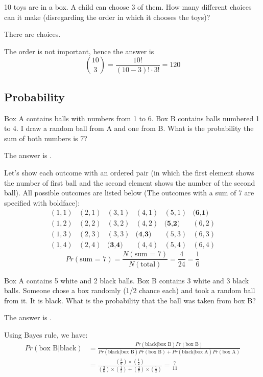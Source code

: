 \documentclass{ximera}
\begin{document}
\begin{question}
10 toys are in a box.  A child can choose 3 of them.  How many different choices can it make (disregarding the order in which it chooses the toys)?  
\begin{solution}
There are  choices.
\end{solution}
The order is not important, hence the answer is
\[
\binom{10}{3} = \frac{10!}{(10-3)! \cdot 3!} = 120
\]
\end{question}

\subsection*{Probability}

\begin{question}
Box A contains balls with numbers from 1 to 6.  Box B contains balls numbered 1 to 4.   I draw a random ball from A and one from B.  What is the probability the sum of both numbers is 7?
\begin{solution}
The answer is .
\end{solution}
Let's show each outcome with an ordered pair (in which the first element shows the number of first ball and the second element shows the number of the second ball). All possible outcomes are listed below (The outcomes with a sum of 7 are specified with boldface):
\[
\begin{matrix}
(1,1) & (2,1) & (3,1) & (4,1) & (5,1) & \textbf{(6,1)} \\
(1,2) & (2,2) & (3,2) & (4,2) & \textbf{(5,2)} & (6,2) \\
(1,3) & (2,3) & (3,3) & \textbf{(4,3)} & (5,3) & (6,3) \\
(1,4) & (2,4) & \textbf{(3,4)} & (4,4) & (5,4) & (6,4)
\end{matrix}
\]
\[
Pr (\text{sum = 7}) = \frac{N(\text{sum = 7})}{N(\text{total})} = \frac{4}{24} = \frac{1}{6}
\]
\end{question}

\begin{question}
Box A contains 5 white and 2 black balls.   Box B contains 3 white and 3 black balls.  Someone chose a box randomly (1/2 chance each) and took a random ball from it.  It is black.  What is the probability that the ball was taken from box B?
\begin{solution}
The answer is .
\end{solution}
Using Bayes rule, we have:
\begin{align*}
Pr (\text{box B} | \text{black}) &= \frac{Pr(\text{black} | \text{box B}) Pr(\text{box B})}{Pr(\text{black} | \text{box B}) Pr(\text{box B}) + Pr(\text{black} | \text{box A}) Pr(\text{box A})} \\
&=\frac{(\frac{3}{6}) \times (\frac{1}{2})}{(\frac{3}{6}) \times (\frac{1}{2}) + (\frac{2}{7}) \times (\frac{1}{2})} = \frac{7}{11}
\end{align*}
\end{question}
\end{document}
